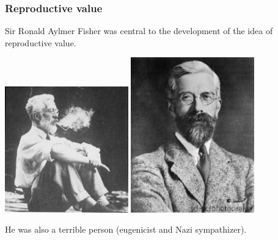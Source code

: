 \documentclass[color=usenames,dvipsnames]{beamer}\usepackage[]{graphicx}\usepackage[]{color}
\begin{document}
\begin{frame}
  \frametitle{Reproductive value}
  Sir Ronald Aylmer Fisher was central to the development of the idea
  of reproductive value.
  \begin{center}
    \includegraphics[width=0.4\textwidth]{figs/fisher1} \hspace{12pt} %
    \includegraphics[width=0.4\textwidth]{figs/fisher2}
  \end{center}
  He was also a terrible person (eugenicist and Nazi sympathizer).
\end{frame}








\end{document}
